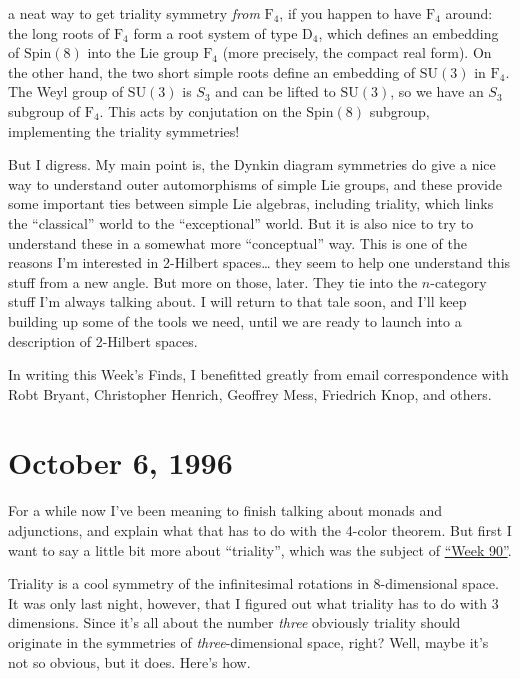 \documentclass{article}
\begin{document}
a neat way to get triality symmetry \emph{from} \(\mathrm{F}_4\), if you
happen to have \(\mathrm{F}_4\) around: the long roots of
\(\mathrm{F}_4\) form a root system of type \(\mathrm{D}_4\), which
defines an embedding of \(\mathrm{Spin}(8)\) into the Lie group
\(\mathrm{F}_4\) (more precisely, the compact real form). On the other
hand, the two short simple roots define an embedding of
\(\mathrm{SU}(3)\) in \(\mathrm{F}_4\). The Weyl group of
\(\mathrm{SU}(3)\) is \(S_3\) and can be lifted to \(\mathrm{SU}(3)\),
so we have an \(S_3\) subgroup of \(\mathrm{F}_4\). This acts by
conjutation on the \(\mathrm{Spin}(8)\) subgroup, implementing the
triality symmetries!

But I digress. My main point is, the Dynkin diagram symmetries do give a
nice way to understand outer automorphisms of simple Lie groups, and
these provide some important ties between simple Lie algebras, including
triality, which links the ``classical'' world to the ``exceptional''
world. But it is also nice to try to understand these in a somewhat more
``conceptual'' way. This is one of the reasons I'm interested in
2-Hilbert spaces\ldots{} they seem to help one understand this stuff
from a new angle. But more on those, later. They tie into the
\(n\)-category stuff I'm always talking about. I will return to that
tale soon, and I'll keep building up some of the tools we need, until we
are ready to launch into a description of 2-Hilbert spaces.

In writing this Week's Finds, I benefitted greatly from email
correspondence with Robt Bryant, Christopher Henrich, Geoffrey Mess,
Friedrich Knop, and others.



\hypertarget{week91}{%
\section{October 6, 1996}\label{week91}}

For a while now I've been meaning to finish talking about monads and
adjunctions, and explain what that has to do with the 4-color theorem.
But first I want to say a little bit more about ``triality'', which was
the subject of \protect\hyperlink{week90}{``Week 90''}.

Triality is a cool symmetry of the infinitesimal rotations in
8-dimensional space. It was only last night, however, that I figured out
what triality has to do with 3 dimensions. Since it's all about the
number \emph{three} obviously triality should originate in the
symmetries of \emph{three}-dimensional space, right? Well, maybe it's
not so obvious, but it does. Here's how.
\end{document}
